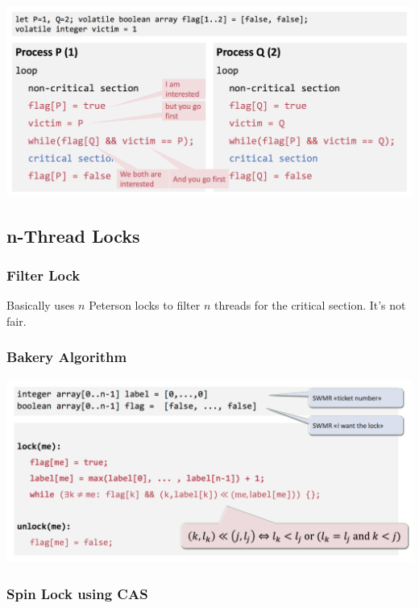 \documentclass[11pt]{article}
\begin{document}
\begin{center}
	\includegraphics[width=400pt]{images/peterson}
\end{center}

\subsection{n-Thread Locks}

\subsubsection{Filter Lock}

Basically uses $n$ Peterson locks to filter $n$ threads for the critical section. It's not fair.

\subsubsection{Bakery Algorithm}

\begin{center}
	\includegraphics[width=400pt]{images/bakery}
\end{center}

\subsubsection{Spin Lock using CAS}
\end{document}
